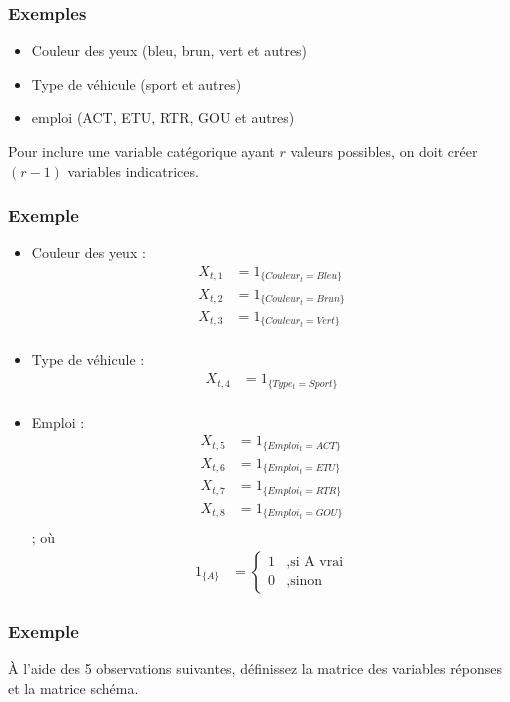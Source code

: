 \documentclass[11pt,french]{report}
\begin{document}
\subsubsection*{Exemples}
\begin{itemize}
\item Couleur des yeux (bleu, brun, vert et autres)
\item Type de véhicule (sport et autres)
\item emploi (ACT, ETU, RTR, GOU et autres)
\end{itemize}
\bigskip

Pour inclure une variable catégorique ayant $r$ valeurs possibles, on doit créer $(r-1)$ variables indicatrices.
\subsubsection*{Exemple}
\begin{itemize}
\item Couleur des yeux : 
\begin{align*}
X_{t,1} &= 1_{\{Couleur_t = Bleu\}} \\
X_{t,2} &= 1_{\{Couleur_t = Brun\}} \\
X_{t,3} &= 1_{\{Couleur_t = Vert\}} \\
\end{align*}
\item Type de véhicule :
\begin{align*}
X_{t,4} &= 1_{\{Type_t = Sport\}} \\
\end{align*}
\item Emploi :
\begin{align*}
X_{t,5} &= 1_{\{Emploi_t = ACT\}} \\
X_{t,6} &= 1_{\{Emploi_t = ETU\}} \\
X_{t,7} &= 1_{\{Emploi_t = RTR\}} \\
X_{t,8} &= 1_{\{Emploi_t = GOU\}} \\
\end{align*}
; où 
\begin{align*}
1_{\{A\}} &= 
\left \lbrace
     \begin{array}{rl}
     1 &, \text{si A vrai} \\
     0 &, \text{sinon}
     \end{array}
     \right.
\end{align*}

\end{itemize}

\subsubsection*{Exemple}
À l'aide des 5 observations suivantes, définissez la matrice des variables réponses et la matrice schéma.
\end{document}
